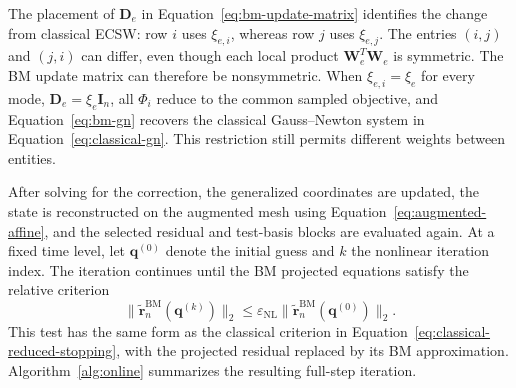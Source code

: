 \documentclass[a4paper,12pt]{article}
\newcommand{\vect}[1]{\boldsymbol{#1}}
\newcommand{\matr}[1]{\boldsymbol{#1}}
\begin{document}
The placement of $\matr{D}_e$ in Equation~\eqref{eq:bm-update-matrix} identifies the change from classical ECSW: row $i$ uses $\xi_{e,i}$, whereas row $j$ uses $\xi_{e,j}$. The entries $(i,j)$ and $(j,i)$ can differ, even though each local product $\matr{W}_e^T\matr{W}_e$ is symmetric. The BM update matrix can therefore be nonsymmetric. When $\xi_{e,i}=\xi_e$ for every mode, $\matr{D}_e=\xi_e\matr{I}_n$, all $\Phi_i$ reduce to the common sampled objective, and Equation~\eqref{eq:bm-gn} recovers the classical Gauss--Newton system in Equation~\eqref{eq:classical-gn}. This restriction still permits different weights between entities.

After solving for the correction, the generalized coordinates are updated, the state is reconstructed on the augmented mesh using Equation~\eqref{eq:augmented-affine}, and the selected residual and test-basis blocks are evaluated again. At a fixed time level, let $\vect{q}^{(0)}$ denote the initial guess and $k$ the nonlinear iteration index. The iteration continues until the BM projected equations satisfy the relative criterion
\begin{equation}
 \|\widetilde{\vect{r}}_n^{\mathrm{BM}}(\vect{q}^{(k)})\|_2
 \leq\varepsilon_{\mathrm{NL}}
       \|\widetilde{\vect{r}}_n^{\mathrm{BM}}(\vect{q}^{(0)})\|_2.
 \label{eq:bm-reduced-stopping}
\end{equation}
This test has the same form as the classical criterion in Equation~\eqref{eq:classical-reduced-stopping}, with the projected residual replaced by its BM approximation. Algorithm~\ref{alg:online} summarizes the resulting full-step iteration.
\end{document}

